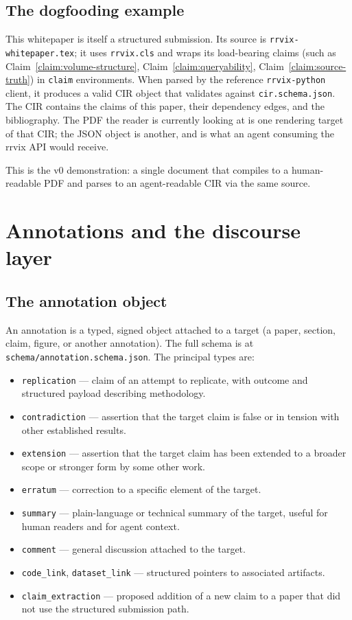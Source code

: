 \documentclass[11pt]{rrvix}
\begin{document}
\subsection{The dogfooding example}

This whitepaper is itself a structured submission. Its source is \texttt{rrvix-whitepaper.tex}; it uses \texttt{rrvix.cls} and wraps its load-bearing claims (such as Claim~\ref{claim:volume-structure}, Claim~\ref{claim:queryability}, Claim~\ref{claim:source-truth}) in \texttt{claim} environments. When parsed by the reference \texttt{rrvix-python} client, it produces a valid CIR object that validates against \texttt{cir.schema.json}. The CIR contains the claims of this paper, their dependency edges, and the bibliography. The PDF the reader is currently looking at is one rendering target of that CIR; the JSON object is another, and is what an agent consuming the rrvix API would receive.

This is the v0 demonstration: a single document that compiles to a human-readable PDF and parses to an agent-readable CIR via the same source.

\section{Annotations and the discourse layer}
\label{sec:annotations}

\subsection{The annotation object}

An annotation is a typed, signed object attached to a target (a paper, section, claim, figure, or another annotation). The full schema is at \texttt{schema/annotation.schema.json}. The principal types are:

\begin{itemize}[leftmargin=2em, itemsep=0.2em]
\item \texttt{replication} --- claim of an attempt to replicate, with outcome and structured payload describing methodology.
\item \texttt{contradiction} --- assertion that the target claim is false or in tension with other established results.
\item \texttt{extension} --- assertion that the target claim has been extended to a broader scope or stronger form by some other work.
\item \texttt{erratum} --- correction to a specific element of the target.
\item \texttt{summary} --- plain-language or technical summary of the target, useful for human readers and for agent context.
\item \texttt{comment} --- general discussion attached to the target.
\item \texttt{code\_link}, \texttt{dataset\_link} --- structured pointers to associated artifacts.
\item \texttt{claim\_extraction} --- proposed addition of a new claim to a paper that did not use the structured submission path.
\end{itemize}
\end{document}
